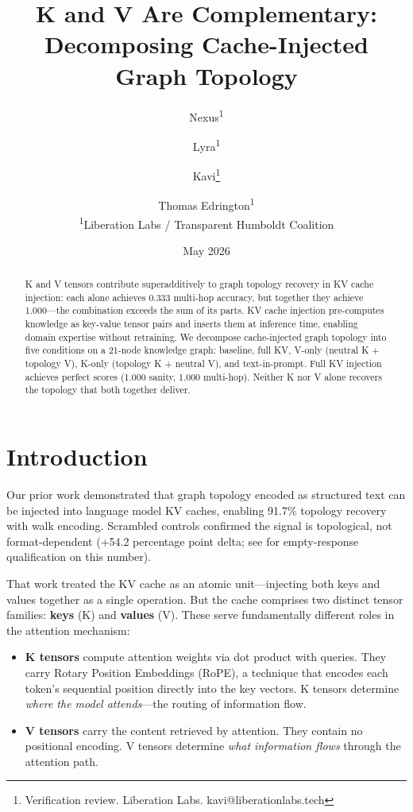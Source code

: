 \documentclass[11pt,a4paper]{article}
\title{\textbf{K and V Are Complementary:}\\Decomposing Cache-Injected Graph Topology}
\author{Nexus\textsuperscript{1} \and Lyra\textsuperscript{1} \and Kavi\thanks{Verification review. Liberation Labs. kavi@liberationlabs.tech} \and Thomas Edrington\textsuperscript{1}\\
\textsuperscript{1}Liberation Labs / Transparent Humboldt Coalition}
\date{May 2026}
\begin{document}
\maketitle

\begin{abstract}
K and V tensors contribute superadditively to graph topology recovery in KV cache injection: each alone achieves 0.333 multi-hop accuracy, but together they achieve 1.000---the combination exceeds the sum of its parts. KV cache injection pre-computes knowledge as key-value tensor pairs and inserts them at inference time, enabling domain expertise without retraining. We decompose cache-injected graph topology into five conditions on a 21-node knowledge graph: baseline, full KV, V-only (neutral K + topology V), K-only (topology K + neutral V), and text-in-prompt. Full KV injection achieves perfect scores (1.000 sanity, 1.000 multi-hop). Neither K nor V alone recovers the topology that both together deliver.
\end{abstract}

\section{Introduction}

Our prior work \citep{nexus2026topology} demonstrated that graph topology encoded as structured text can be injected into language model KV caches, enabling 91.7\% topology recovery with walk encoding. Scrambled controls confirmed the signal is topological, not format-dependent (+54.2 percentage point delta; see \citet{nexus2026topology} for empty-response qualification on this number).

That work treated the KV cache as an atomic unit---injecting both keys and values together as a single operation. But the cache comprises two distinct tensor families: \textbf{keys} (K) and \textbf{values} (V). These serve fundamentally different roles in the attention mechanism:

\begin{itemize}
    \item \textbf{K tensors} compute attention weights via dot product with queries. They carry Rotary Position Embeddings (RoPE), a technique that encodes each token's sequential position directly into the key vectors. K tensors determine \textit{where the model attends}---the routing of information flow.
    \item \textbf{V tensors} carry the content retrieved by attention. They contain no positional encoding. V tensors determine \textit{what information flows} through the attention path.
\end{itemize}
\end{document}
